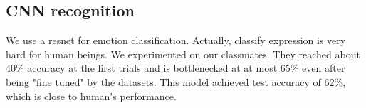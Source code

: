 \subsection{CNN recognition}
We use a resnet for emotion classification. Actually, classify expression is very hard for human beings. We experimented on our classmates. They reached about 40\% accuracy at the first trials and is bottlenecked at at most 65\% even after being "fine tuned" by the datasets. This model achieved test accuracy of 62\%, which is close to human's performance.


